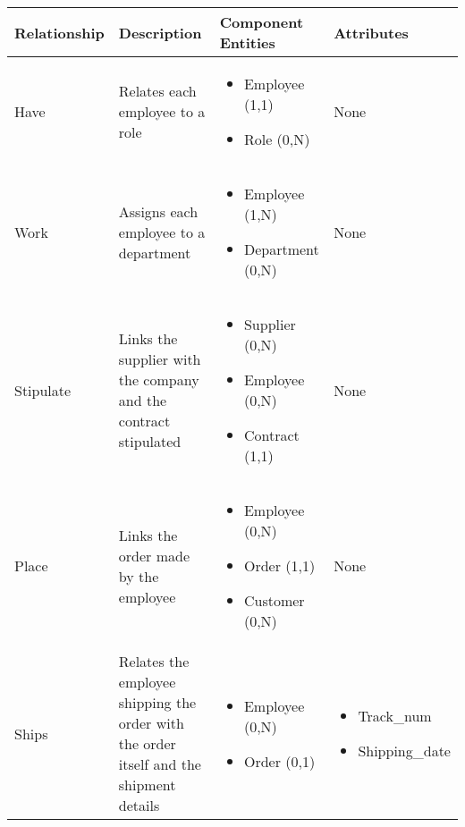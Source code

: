 \begin{longtable}{|p{}|p{} |p{}|p{} |} 
\hline
\textbf{Relationship} & \textbf{Description} & \textbf{Component Entities} & \textbf{Attributes} \\\hline


Have & Relates each employee to a role & \begin{itemize}
        \vspace{-1em}
        \item Employee (1,1)
        \item Role (0,N)
    \end{itemize}
 &  None \\\hline
 
Work & Assigns each employee to a department & \begin{itemize}
        \vspace{-1em}
        \item Employee (1,N)
        \item Department (0,N)
    \end{itemize}
 &  None \\\hline

Stipulate & Links the supplier with the company and the contract stipulated  & \begin{itemize}
	\vspace{-1em}
	\item Supplier (0,N) 
	\item Employee (0,N)
    \item Contract  (1,1)
	\end{itemize}
&  None\\\hline

Place & Links the order made by the employee & \begin{itemize}
	\vspace{-1em}
	\item Employee (0,N)
	\item Order (1,1)
	\item Customer (0,N)	
\end{itemize}
&  None \\\hline

Ships & Relates the employee shipping the order with the order itself and the shipment details &
\begin{itemize}
	\vspace{-1em}
	\item Employee (0,N)
	\item Order (0,1)
\end{itemize}
&
 \begin{itemize}
 	\vspace{-1em}
 	\item Track\_num
 	\item Shipping\_date
 \end{itemize}
 \\\hline


\end{longtable}
